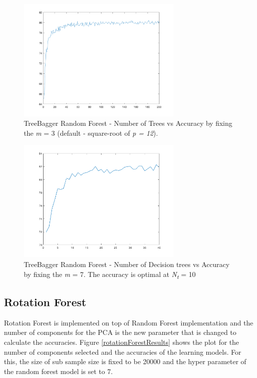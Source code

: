 \documentclass[journal, a4paper]{IEEEtran}
\begin{document}
\begin{figure}[ht!]
\centering
\includegraphics[width=80mm]{images/RandomForestPrediction200.png}
\caption{TreeBagger Random Forest - Number of Trees vs Accuracy by fixing the \textit{m} = 3 (default - square-root of \textit{p = 12}).}
\label{tbrfnumpred}
\end{figure}

\begin{figure}[ht!]
\centering
\includegraphics[width=80mm]{images/TBRF_NTrees_1_to_40.png}
\caption{TreeBagger Random Forest - Number of Decision trees vs Accuracy by fixing the \textit{m} = 7. The accuracy is optimal at \textit{N\textsubscript{t}} = 10}
\label{tbrfnumtrees}
\end{figure}

\subsection{Rotation Forest}
Rotation Forest is implemented on top of Random Forest implementation and the number of components for the PCA is the new parameter that is changed to calculate the accuracies. Figure \ref{rotationForestResults} shows the plot for the number of components selected and the accuracies of the learning models. For this, the size of sub sample size is fixed to be 20000 and the hyper parameter of the random forest model is set to 7.
\end{document}

